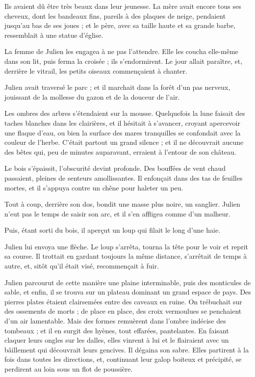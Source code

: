 \documentclass[]{book}
\begin{document}
                Ils avaient dû être très beaux dans leur jeunesse. La mère avait encore tous ses cheveux, dont les bandeaux fins, pareils à des plaques de neige, pendaient jusqu'au bas de ses joues ; et le père, avec sa taille haute et sa grande barbe, ressemblait à une statue d'église.
                    
                La femme de Julien les engagea à ne pas l'attendre. Elle les coucha elle-même dans son lit, puis ferma la croisée ; ils s'endormirent. Le jour allait paraître, et, derrière le vitrail, les petits oiseaux commençaient à chanter.
                    
                Julien avait traversé le parc ; et il marchait dans la forêt d'un pas nerveux, jouissant de la mollesse du gazon et de la douceur de l'air.
                    
                Les ombres des arbres s'étendaient sur la mousse. Quelquefois la lune faisait des taches blanches dans les clairières, et il hésitait à s'avancer, croyant apercevoir une flaque d'eau, ou bien la surface des mares tranquilles se confondait avec la couleur de l'herbe. C'était partout un grand silence ; et il ne découvrait aucune des bêtes qui, peu de minutes auparavant, erraient à l'entour de son château.
                    
                Le bois s'épaissit, l'obscurité devint profonde. Des bouffées de vent chaud passaient, pleines de senteurs amollissantes. Il enfonçait dans des tas de feuilles mortes, et il s'appuya contre un chêne pour haleter un peu.
                    
                Tout à coup, derrière son dos, bondit une masse plus noire, un sanglier. Julien n'eut pas le temps de saisir son arc, et il s'en affligea comme d'un malheur.
                    
                Puis, étant sorti du bois, il aperçut un loup qui filait le long d'une haie.
                    
                Julien lui envoya une flèche. Le loup s'arrêta, tourna la tête pour le voir et reprit sa course. Il trottait en gardant toujours la même distance, s'arrêtait de temps à autre, et, sitôt qu'il était visé, recommençait à fuir.
                    
                Julien parcourut de cette manière une plaine interminable, puis des monticules de sable, et enfin, il se trouva sur un plateau dominant un grand espace de pays. Des pierres plates étaient clairsemées entre des caveaux en ruine. On trébuchait sur des ossements de morts ; de place en place, des croix vermoulues se penchaient d'un air lamentable. Mais des formes remuèrent dans l'ombre indécise des tombeaux ; et il en surgit des hyènes, tout effarées, pantelantes. En faisant claquer leurs ongles sur les dalles, elles vinrent à lui et le flairaient avec un bâillement qui découvrait leurs gencives. Il dégaina son sabre. Elles partirent à la fois dans toutes les directions, et, continuant leur galop boiteux et précipité, se perdirent au loin sous un flot de poussière.
                    
\end{document}
